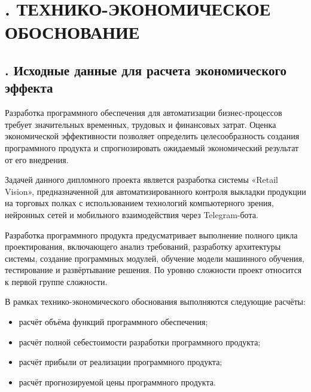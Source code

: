 \setcounter{chaptercntr}{6}
\setcounter{subchaptercntr}{1}
\setcounter{formulacntr}{1}
\setcounter{tablecntr}{1}

\sectionbreak \section*{
    \gostTitleFont
    \redline
    \thechaptercntr .
    ТЕХНИКО-ЭКОНОМИЧЕСКОЕ ОБОСНОВАНИЕ
}

\titlespace

\subsection*{ 
    \gostTitleFont
    \redline
    \thechaptercntr .\thesubchaptercntr \spc
    Исходные данные для расчета экономического эффекта
} \addtocounter{subchaptercntr}{1}

\subtitlespace

{\gostFont

    \par \redline Разработка программного обеспечения для автоматизации бизнес-процессов требует значительных временных, трудовых и финансовых затрат. Оценка экономической эффективности позволяет определить целесообразность создания программного продукта и спрогнозировать ожидаемый экономический результат от его внедрения.

    \par \redline Задачей данного дипломного проекта является разработка системы «Retail Vision», предназначенной для автоматизированного контроля выкладки продукции на торговых полках с использованием технологий компьютерного зрения, нейронных сетей и мобильного взаимодействия через Telegram-бота.

    \par \redline Разработка программного продукта предусматривает выполнение полного цикла проектирования, включающего анализ требований, разработку архитектуры системы, создание программных модулей, обучение модели машинного обучения, тестирование и развёртывание решения. По уровню сложности проект относится к первой группе сложности.

    \par \redline В рамках технико-экономического обоснования выполняются следующие расчёты:

    \begin{itemize}[leftmargin=2.15cm, labelwidth=0.65cm, labelsep=0.0cm]
        \item[•~] расчёт объёма функций программного обеспечения;
        \item[•~] расчёт полной себестоимости разработки программного продукта;
        \item[•~] расчёт прибыли от реализации программного продукта;
        \item[•~] расчёт прогнозируемой цены программного продукта.
    \end{itemize}

}

